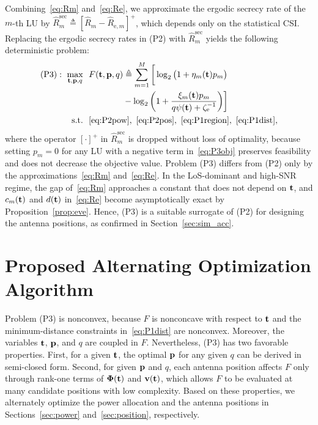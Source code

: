 \documentclass[journal]{IEEEtran}
\begin{document}
Combining~\eqref{eq:Rm} and~\eqref{eq:Re}, we approximate the ergodic secrecy rate of the $m$-th LU by $\hat R_m^{\mathrm{sec}}\triangleq[\hat R_m-\hat R_{\mathrm{e},m}]^+$, which depends only on the statistical CSI. Replacing the ergodic secrecy rates in (P2) with $\hat R_m^{\mathrm{sec}}$ yields the following deterministic problem:
\begin{subequations}\label{eq:P3}
\begin{align}
(\mathrm{P3}):\ \max_{\bt,\bp,q}\ \ & F(\bt,\bp,q)\triangleq\sum_{m=1}^{M}\bigg[\log_2\big(1+\eta_m(\bt)p_m\big)\nonumber\\
&\qquad\qquad-\log_2\bigg(1+\frac{\xi_m(\bt)p_m}{q\psi(\bt)+\zeta_{\mathrm e}^{-1}}\bigg)\bigg]\label{eq:P3obj}\\
\mathrm{s.t.}\ \ & \eqref{eq:P2pow},\ \eqref{eq:P2pos},\ \eqref{eq:P1region},\ \eqref{eq:P1dist},\nonumber
\end{align}
\end{subequations}
where the operator $[\cdot]^+$ in $\hat R_m^{\mathrm{sec}}$ is dropped without loss of optimality, because setting $p_m=0$ for any LU with a negative term in~\eqref{eq:P3obj} preserves feasibility and does not decrease the objective value. Problem (P3) differs from (P2) only by the approximations~\eqref{eq:Rm} and~\eqref{eq:Re}. In the LoS-dominant and high-SNR regime, the gap of~\eqref{eq:Rm} approaches a constant that does not depend on $\mathbf{t}$, and $c_m(\mathbf{t})$ and $d(\mathbf{t})$ in~\eqref{eq:Re} become asymptotically exact by Proposition~\ref{prop:eve}. Hence, (P3) is a suitable surrogate of (P2) for designing the antenna positions, as confirmed in Section~\ref{sec:sim_acc}.

\section{Proposed Alternating Optimization Algorithm}\label{sec:opt}
Problem (P3) is nonconvex, because $F$ is nonconcave with respect to $\mathbf{t}$ and the minimum-distance constraints in~\eqref{eq:P1dist} are nonconvex. Moreover, the variables $\mathbf{t}$, $\mathbf{p}$, and $q$ are coupled in $F$. Nevertheless, (P3) has two favorable properties. First, for a given $\mathbf{t}$, the optimal $\mathbf{p}$ for any given $q$ can be derived in semi-closed form. Second, for given $\mathbf{p}$ and $q$, each antenna position affects $F$ only through rank-one terms of $\boldsymbol{\Phi}(\mathbf{t})$ and $\mathbf{v}(\mathbf{t})$, which allows $F$ to be evaluated at many candidate positions with low complexity. Based on these properties, we alternately optimize the power allocation and the antenna positions in Sections~\ref{sec:power} and~\ref{sec:position}, respectively.
\end{document}

